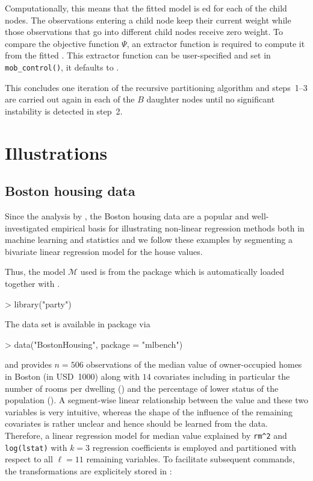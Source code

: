 \documentclass{Z}
\begin{document}
Computationally, this means that the fitted model  is ed
for each of the child nodes. The observations entering a child node keep their
current weight while those observations that go into different child nodes receive
zero weight. To compare the objective function $\Psi$, an extractor function
is required to compute it from the fitted . This extractor function
can be user-specified and set in \verb:mob_control():, it defaults to .


This concludes one iteration of the recursive partitioning algorithm and steps~1--3
are carried out again in each of the $B$ daughter nodes until no significant 
instability is detected in step~2.

\section{Illustrations}
\label{sec:illustration}

\subsection{Boston housing data}

Since the analysis by \cite{BreimanFriedman1985}, the Boston housing data are 
a popular and well-investigated empirical basis for illustrating non-linear 
regression methods both in machine learning and statistics
\citep[see][for two recent examples]{Gama2004,Samarovetal2005} and we follow 
these examples by segmenting a bivariate linear regression model for the house
values.

Thus, the model $\mathcal{M}$ used is  from the 
package which is automatically loaded together with .

\begin{Schunk}
\begin{Sinput}
> library("party")
\end{Sinput}
\end{Schunk}

The data set is available in package  via

\begin{Schunk}
\begin{Sinput}
> data("BostonHousing", package = "mlbench")
\end{Sinput}
\end{Schunk}

and provides $n = 506$ observations of the median value of owner-occupied
homes in Boston (in USD~1000) along with $14$ covariates including in particular
the number of rooms per dwelling () and the percentage
of lower status of the population (). A segment-wise linear relationship between
the value and these two variables is very intuitive, whereas the shape of the influence
of the remaining covariates is rather unclear and hence should be learned from the data.
Therefore, a linear regression model for median value explained by \verb:rm^2:
and \verb:log(lstat): with $k = 3$ regression coefficients is employed and
partitioned with respect to all $\ell = 11$ remaining variables. To facilitate subsequent
commands, the transformations are explicitely stored in :
\end{document}
